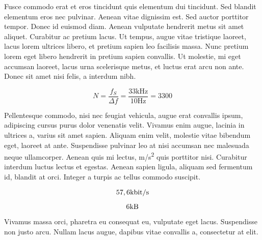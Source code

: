 \documentclass[a4paper,9pt]{scrartcl}
\begin{document}
Fusce commodo erat et eros tincidunt quis elementum dui tincidunt. Sed blandit elementum eros nec pulvinar. Aenean vitae dignissim est. Sed auctor porttitor tempor. Donec id euismod diam. Aenean vulputate hendrerit metus sit amet aliquet. Curabitur ac pretium lacus. Ut tempus, augue vitae tristique laoreet, lacus lorem ultrices libero, et pretium sapien leo facilisis massa. Nunc pretium lorem eget libero hendrerit in pretium sapien convallis. Ut molestie, mi eget accumsan laoreet, lacus urna scelerisque metus, et luctus erat arcu non ante. Donec sit amet nisi felis, a interdum nibh.

\[ N = \frac{f_S}{\Delta f} = \frac{33\si{\kilo\hertz}}{10\si{\hertz}} = 3300\]

Pellentesque commodo, nisi nec feugiat vehicula, augue erat convallis ipsum, adipiscing cursus purus dolor venenatis velit. Vivamus enim augue, lacinia in ultrices a, varius sit amet sapien. Aliquam enim velit, molestie vitae bibendum eget, laoreet at ante. Suspendisse pulvinar leo at nisi accumsan nec malesuada neque ullamcorper. Aenean quis mi lectus, \si{\meter/\second^2} quis porttitor nisi. Curabitur interdum luctus lectus et egestas. Aenean sapien ligula, aliquam sed fermentum id, blandit at orci. Integer a turpis ac tellus commodo suscipit. 


\[ 57,6 \si[per-mode=symbol]{\kilo\bit\per\second} \]

\[ 6 \si{\kilo\byte} \]

Vivamus massa orci, pharetra eu consequat eu, vulputate eget lacus. Suspendisse non justo arcu. Nullam lacus augue, dapibus vitae convallis a, consectetur at elit.
\end{document}
